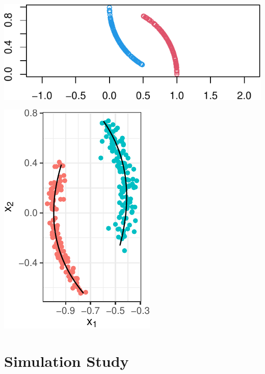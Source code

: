 \documentclass[12pt]{article}
\begin{document}
\begin{example}


\begin{center}\includegraphics{draft_files/figure-latex/unnamed-chunk-12-1} \end{center}






\begin{center}\includegraphics{draft_files/figure-latex/unnamed-chunk-15-1} \end{center}

\end{example}

\hypertarget{simulation-study}{%
\section{Simulation Study}\label{simulation-study}}



\end{document}
